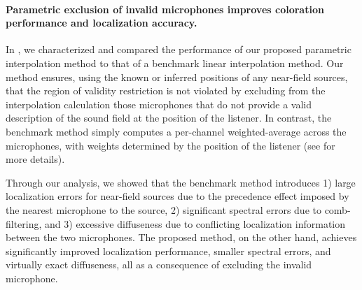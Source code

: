 \paragraph{Parametric exclusion of invalid microphones improves coloration performance and localization accuracy.}
In , we characterized and compared the performance of our proposed parametric interpolation method to that of a benchmark linear interpolation method.
Our method ensures, using the known or inferred positions of any near-field sources, that the region of validity restriction is not violated by excluding from the interpolation calculation those microphones that do not provide a valid description of the sound field at the position of the listener.
In contrast, the benchmark method simply computes a per-channel weighted-average across the microphones, with weights determined by the position of the listener (see  for more details).

Through our analysis, we showed that the benchmark method introduces 1) large localization errors for near-field sources due to the precedence effect imposed by the nearest microphone to the source, 2) significant spectral errors due to comb-filtering, and 3) excessive diffuseness due to conflicting localization information between the two microphones.
The proposed method, on the other hand, achieves significantly improved localization performance, smaller spectral errors, and virtually exact diffuseness, all as a consequence of excluding the invalid microphone.


